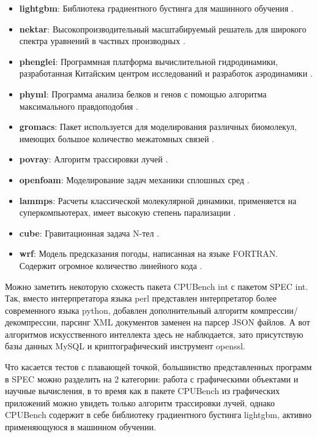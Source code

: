 \begin{itemize}
	\item  \textbf{lightgbm}: Библиотека градиентного бустинга для машинного обучения \cite{ke2017lightgbm}.
	\item  \textbf{nektar}: Высокопроизводительный масштабируемый решатель для широкого спектра уравнений в частных производных \cite{cantwell2015nektar++}.
	\item  \textbf{phenglei}: Программная платформа вычислительной гидродинамики, разработанная Китайским центром исследований и разработок аэродинамики \cite{zhao2020design}.
	\item  \textbf{phyml}: Программа анализа белков и генов с помощью алгоритма максимального правдоподобия \cite{guindon2010new}.
	\item  \textbf{gromacs}: Пакет используется для моделирования различных биомолекул, имеющих большое количество межатомных связей \cite{van2005gromacs}.
	\item  \textbf{povray}: Алгоритм трассировки лучей \cite{plachetka1998pov}.
	\item  \textbf{openfoam}: Моделирование задач механики сплошных сред \cite{jasak2009openfoam}. 
	\item  \textbf{lammps}: Расчеты классической молекулярной динамики, применяется на суперкомпьютерах, имеет высокую степень парализации \cite{gowthaman2023review}.
	\item  \textbf{cube}: Гравитационная задача N-тел \cite{yu2018cube}.
	\item  \textbf{wrf}: Модель предсказания погоды, написанная на языке FORTRAN. Содержит огромное количество линейного кода \cite{skamarock2019description}. 	        
\end{itemize}

Можно заметить некоторую схожесть пакета CPUBench int с пакетом SPEC int. Так, вместо интерпретатора языка perl представлен интерпретатор более современного языка python, добавлен дополнительный алгоритм компрессии/декомпрессии, парсинг XML документов заменен на парсер JSON файлов. А вот алгоритмов искусственного интеллекта здесь не наблюдается, зато присутствую базы данных MySQL и криптографический инструмент openssl.

Что касается тестов с плавающей точкой, большинство представленных программ в SPEC можно разделить на 2 категории: работа с графическими объектами и научные вычисления, в то время как в пакете CPUBench из графических приложений можно увидеть только алгоритм трассировки лучей, однако CPUBench содержит в себе библиотеку градиентного бустинга lightgbm, активно применяющуюся в машинном обучении. 

